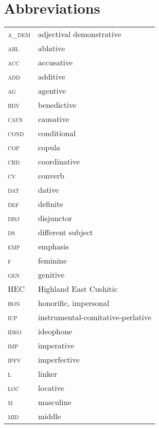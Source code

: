 \documentclass[output=paper]{langscibook}
\begin{document}
\section*{Abbreviations}
\begin{tabularx}{.45\textwidth}{lQ}
\textsc{a\_dem} & adjectival demonstrative\\
\textsc{abl} & ablative\\
\textsc{acc} & accusative\\
\textsc{add} & additive\\
\textsc{ag} & agentive\\
\textsc{bdv} & benedictive\\
\textsc{caus} & causative\\
\textsc{cond} & conditional\\
\textsc{cop} & copula\\
\textsc{crd} & coordinative\\
\textsc{cv} & converb\\
\textsc{dat} & dative\\
\textsc{def} & definite\\
\textsc{disj} & disjunctor\\
\textsc{ds} & different subject\\
\textsc{emp} & emphasis\\
\textsc{f} & feminine\\
\textsc{gen} & genitive\\
\textsc{HEC} & Highland East Cushitic\\
\textsc{hon} & honorific, impersonal\\
\textsc{icp} & instrumental-comitative-perlative\\
\textsc{ideo} & ideophone\\
\textsc{imp} & imperative\\
\textsc{ipfv} & imperfective\\
\textsc{l} & linker\\
\textsc{loc} & locative\\
\textsc{m} & masculine\\
\textsc{mid} & middle\\
\end{tabularx}
\end{document}
